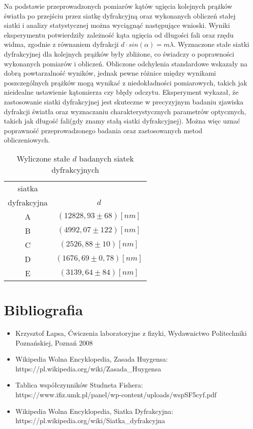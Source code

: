 \documentclass{article}
\begin{document}
Na podstawie przeprowadzonych pomiarów kątów ugięcia kolejnych prążków światła po przejściu przez siatkę dyfrakcyjną oraz wykonanych obliczeń stałej siatki i analizy statystycznej można wyciągnąć następujące wnioski. Wyniki eksperymentu potwierdziły zależność kąta ugięcia od długości fali oraz rzędu widma, zgodnie z równaniem dyfrakcji $d \cdot sin(\alpha)=m \lambda$. Wyznaczone stałe siatki dyfrakcyjnej dla kolejnych prążków były zbliżone, co świadczy o poprawności wykonanych pomiarów i obliczeń. Obliczone odchylenia standardowe wskazały na dobrą powtarzalność wyników, jednak pewne różnice między wynikami poszczególnych prążków mogą wynikać z niedokładności pomiarowych, takich jak nieidealne ustawienie kątomierza czy błędy odczytu. Eksperyment wykazał, że zastosowanie siatki dyfrakcyjnej jest skuteczne w precyzyjnym badaniu zjawiska dyfrakcji światła oraz wyznaczaniu charakterystycznych parametrów optycznych, takich jak długość fali(gdy znamy stałą siatki dyfrakcyjnej). Można więc uznać poprawność przeprowadzonego badania oraz zastosowanych metod obliczeniowych.

\FloatBarrier
\begin{table}[!ht]
    \centering
    \begin{tabular}{c|c}
         siatka \\dyfrakcyjna & $d$ \\\hline
         A & $(12828,93 \pm 68)[nm]$\\ \hline
         B & $(4992,07  \pm 122)[nm]$\\ \hline
         C & $(2526,88 \pm 10)[nm]$\\ \hline
         D & $(1676,69 \pm 0,78)[nm]$\\ \hline
         E & $(3139,64 \pm 84)[nm]$\\
    \end{tabular}
    \caption{Wyliczone stałe $d$ badanych siatek dyfrakcyjnych}
    \label{tab:my_label}
\end{table}

\FloatBarrier

\section*{Bibliografia}
\begin{itemize}
    \item Krzysztof Łapsa, Ćwiczenia laboratoryjne z fizyki, Wydawnictwo Politechniki Poznańskiej, Poznań 2008
    \item Wikipedia Wolna Encyklopedia, Zasada Huygensa: https://pl.wikipedia.org/wiki/Zasada\_Huygensa
    \item  Tablica współczynników Studneta Fishera: https://www.ifiz.umk.pl/panel/wp-content/uploads/wspSF5cyf.pdf
    \item Wikipedia Wolna Encyklopedia, Siatka Dyfrakcyjna: https://pl.wikipedia.org/wiki/Siatka\_dyfrakcyjna
\end{itemize}
\end{document}
